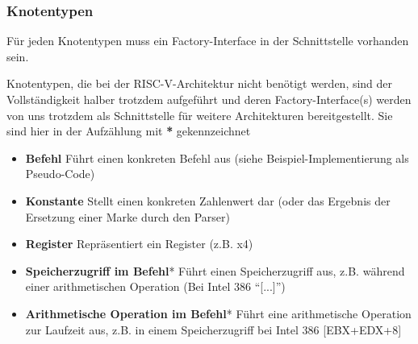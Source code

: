 \subsubsection{Knotentypen}
Für jeden Knotentypen muss ein Factory-Interface in der Schnittstelle vorhanden sein.

Knotentypen, die bei der RISC-V-Architektur nicht benötigt werden, sind der Vollständigkeit halber trotzdem aufgeführt und deren Factory-Interface(s) werden von uns trotzdem als Schnittstelle für weitere Architekturen bereitgestellt. Sie sind hier in der Aufzählung mit \textbf{*} gekennzeichnet
\begin{itemize}
  \item \textbf{Befehl} Führt einen konkreten Befehl aus (siehe Beispiel-Implementierung als Pseudo-Code)

  \item \textbf{Konstante} Stellt einen konkreten Zahlenwert dar (oder das Ergebnis der Ersetzung einer Marke durch den Parser)

  \item \textbf{Register} Repräsentiert ein Register (z.B. x4)

  \item \textbf{Speicherzugriff im Befehl}* Führt einen Speicherzugriff aus, z.B. während einer arithmetischen Operation (Bei Intel 386 ``[...]'')

  \item \textbf{Arithmetische Operation im Befehl}* Führt eine arithmetische Operation zur Laufzeit aus, z.B. in einem Speicherzugriff bei Intel 386 [EBX+EDX+8]

\end{itemize}
